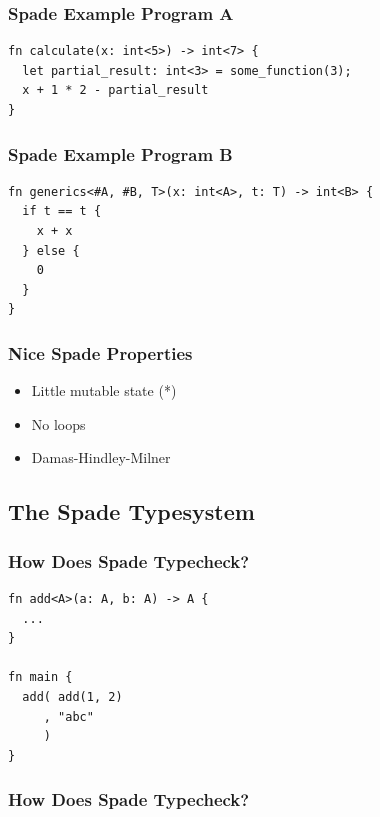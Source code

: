 \documentclass{beamer}
\begin{document}
\begin{frame}[containsverbatim]
\frametitle{Spade Example Program A}
\large
\centering
\begin{verbatim}
fn calculate(x: int<5>) -> int<7> {
  let partial_result: int<3> = some_function(3);
  x + 1 * 2 - partial_result
}
\end{verbatim}
\end{frame}

\begin{frame}[containsverbatim]
\frametitle{Spade Example Program B}
\large
\centering
\begin{verbatim}
fn generics<#A, #B, T>(x: int<A>, t: T) -> int<B> {
  if t == t {
    x + x
  } else {
    0
  }
}
\end{verbatim}
\end{frame}

\begin{frame}[containsverbatim]
\frametitle{Nice Spade Properties}
\begin{itemize}
  \item Little mutable state (*)
  \item No loops
  \item Damas-Hindley-Milner
\end{itemize}
\end{frame}

\subsection{The Spade Typesystem}

\begin{frame}[containsverbatim]
\frametitle{How Does Spade Typecheck?}
\large
\centering
\begin{verbatim}
fn add<A>(a: A, b: A) -> A {
  ...
}

fn main {
  add( add(1, 2)
     , "abc"
     )
}
\end{verbatim}
\end{frame}

\begin{frame}[containsverbatim]
\frametitle{How Does Spade Typecheck?}
\end{frame}
  
\end{document}
